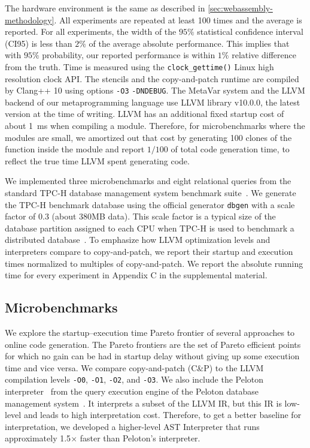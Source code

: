 \documentclass[acmsmall,nonacm,screen]{acmart}\settopmatter{printfolios=true,printccs=true,printacmref=false}
\newcommand{\secref}[1]{\autoref{#1}}
\newcommand{\appendixNumbers}{Appendix C}
\newcommand{\llvm}{LLVM}
\newcommand{\ozero}{\texttt{-O0}}
\newcommand{\oone}{\texttt{-O1}}
\newcommand{\otwo}{\texttt{-O2}}
\newcommand{\othree}{\texttt{-O3}}
\newcommand{\cp}{copy-and-patch}
\newcommand{\cpshort}{C\&P}
\newcommand{\X}{$\times$}
\begin{document}
The hardware environment is the same as described in \secref{sec:webassembly-methodology}. All experiments are repeated at least \num{100} times and the average is reported. For all experiments, the width of the $95\%$ statistical confidence interval (CI95) is less than $2\%$ of the average absolute performance. This implies that with $95\%$ probability, our reported performance is within $1\%$ relative difference from the truth. Time is measured using the {\tt clock\_gettime()} Linux high resolution clock API. The stencils and the \cp{} runtime are compiled by Clang++ 10 using options {\tt -O3} {\tt -DNDEBUG}. The MetaVar system and the LLVM backend of our metaprogramming language use LLVM library v10.0.0, the latest version at the time of writing. LLVM has an additional fixed startup cost of about \SI{1}{\milli\second} when compiling a module. Therefore, for microbenchmarks where the modules are small, we amortized out that cost by generating \num{100} clones of the function inside the module and report $1/100$ of total code generation time, to reflect the true time \llvm{} spent generating code. 

We implemented three microbenchmarks and eight relational queries from the standard TPC-H database management system benchmark suite~\cite{tpch}. We generate the TPC-H benchmark database using the official generator {\tt dbgen} with a scale factor of \num{0.3} (about 380MB data). This scale factor is a typical size of the database partition assigned to each CPU when TPC-H is used to benchmark a distributed database~\cite{memsqlPersonalCommunication,postgresTpch}. To emphasize how LLVM optimization levels and interpreters compare to \cp{}, we report their startup and execution times normalized to multiples of \cp{}.
We report the absolute running time for every experiment in \appendixNumbers{} in the supplemental material.



\subsection{Microbenchmarks}
\label{sec:pareto-frontier}

We explore the startup--execution time Pareto frontier of several approaches to online code generation. The Pareto frontiers are the set of Pareto efficient points for which no gain can be had in startup delay without giving up some execution time and vice versa. We compare \cp{} (\cpshort{}) to the \llvm{} compilation levels \ozero{}, \oone{}, \otwo{}, and \othree{}. We also include the Peloton interpreter~\cite{pelotonInterpreter} from the query execution engine of the Peloton database management system~\cite{peloton, pelotonQueryCompilation}. It interprets a subset of the LLVM IR, but this IR is low-level and leads to high interpretation cost. Therefore, to get a better baseline for interpretation, we developed a higher-level AST Interpreter that runs approximately \num{1.5}\X{} faster than Peloton's interpreter.
\end{document}
